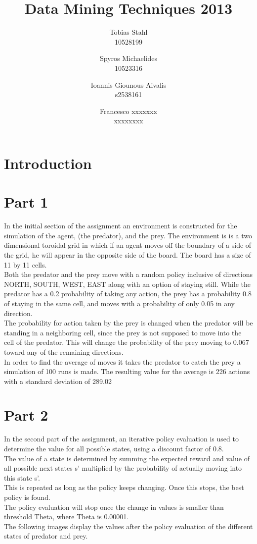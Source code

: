 \documentclass[11pt]{article}
\title{
	\textbf{Data Mining Techniques 2013}
}
\author{Tobias Stahl \\ 10528199 \and Spyros Michaelides \\ 10523316 \and Ioannis Giounous Aivalis \\ s2538161 \and Francesco xxxxxxx \\ xxxxxxxx}
\date{}
\begin{document}
\maketitle

\section{Introduction}



\section{Part 1}

In the initial section of the assignment an environment is constructed for the simulation of the agent, (the predator), and the prey. The environment is is a two dimensional toroidal grid in which if an agent moves off the boundary of a side of the grid, he will appear in the opposite side of the board. The board has a size of 11 by 11 cells.\\
Both the predator and the prey move with a random policy inclusive of directions NORTH, SOUTH, WEST, EAST along with an option of staying still. While the predator has a 0.2 probability of taking any action, the prey has a probability 0.8 of staying in the same cell, and moves with a probability of only 0.05 in any direction.\\
The probability for action taken by the prey is changed when the predator will be standing in a neighboring cell, since the prey is not supposed to move into the cell of the predator. This will change the probability of the prey moving to 0.067 toward any of the remaining directions.\\
In order to find the average of moves it takes the predator to catch the prey a simulation of 100 runs is made. The resulting value for the average is 226 actions with a standard deviation of 289.02



\section{Part 2}

In the second part of the assignment, an iterative policy evaluation is used to determine the value for all possible states, using a discount factor of 0.8.\\
The value of a state is determined by summing the expected reward and value of all possible next states s' multiplied by the probability of actually moving into this state s'.\\
This is repeated as long as the policy keeps changing. Once this stops, the best policy is found.\\
The policy evaluation will stop once the change in values is smaller than threshold Theta, where Theta is 0.00001.\\
The following images display the values after the policy evaluation of the different states of predator and prey.
\end{document}
